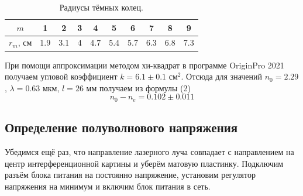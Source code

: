\documentclass[a4paper,12pt]{article} %
\begin{document}
\begin{table}[h]
\begin{tabular}{|c|c|c|c|c|c|c|c|c|c|}
\hline
$m$     & 1   & 2   & 3   & 4   & 5   & 6   & 7   & 8   & 9 \\ \hline
$r_m$, см & 1.9 & 3.1 & 4 & 4.7 & 5.4 & 5.7 & 6.3 & 6.8 & 7.3 \\ \hline
\end{tabular}
\centering
\caption{Радиусы тёмных колец.}
\end{table}
\begin{center}
\end{center}

При помощи аппроксимации методом хи-квадрат в программе OriginPro 2021 получаем угловой коэффициент $k = 6.1 \pm 0.1 \text{ см}^2$. Отсюда для значений $n_0 = 2.29$, $\lambda = 0.63 \text{ мкм}$, $l = 26 \text{ мм}$ получаем из формулы (2)
\[
\boxed{n_0 - n_e = 0.102 \pm 0.011}
\]  
\subsection*{Определение полуволнового напряжения}
\par Убедимся ещё раз, что направление лазерного луча совпадает с направлением на центр интерференционной картины и уберём матовую пластинку. Подключим разъём блока питания на постоянно напряжение, установим регулятор напряжения на минимум и включим блок питания в сеть.
\end{document}
